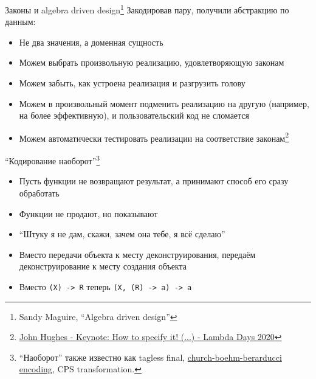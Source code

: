     \begin{frame}[fragile]{Законы и algebra driven design\footnote{Sandy Maguire, ``Algebra driven design''} \popslide}
        Закодировав пару, получили абстракцию по данным:
        \begin{itemize}
            \item Не два значения, а доменная сущность
            \item Можем выбрать произвольную реализацию, удовлетворяющую законам
            \item Можем забыть, как устроена реализация и разгрузить голову
            \item Можем в произвольный момент подменить реализацию на другую (например, на более эффективную), и пользовательский код не сломается
            \item Можем автоматически тестировать реализации на соответствие законам\footnote{\href{https://youtu.be/G0NUOst-53U?si=yrFoPQ-kSSPF1Xtb}{\color{blue} John Hughes - Keynote: How to specify it! (...) - Lambda Days 2020}}
        \end{itemize}
    \end{frame}

    \begin{frame}[fragile]{``Кодирование наоборот''\footnote{``Наоборот'' также известно как tagless final, \href{https://okmij.org/ftp/tagless-final/course/Boehm-Berarducci.html}{\color{blue} church-boehm-berarducci encoding}, CPS transformation.} \popslide}
        \begin{itemize}
            \item Пусть функции не возвращают результат, а принимают способ его сразу обработать
            \item Функции не продают, но показывают
            \item ``Штуку я не дам, скажи, зачем она тебе, я всё сделаю''
            \item Вместо передачи объекта к месту деконструирования, передаём деконструирование к месту создания объекта
            \item Вместо \texttt{(X) -> R} теперь \texttt{(X, (R) -> a) -> a}
        \end{itemize}
    \end{frame}

